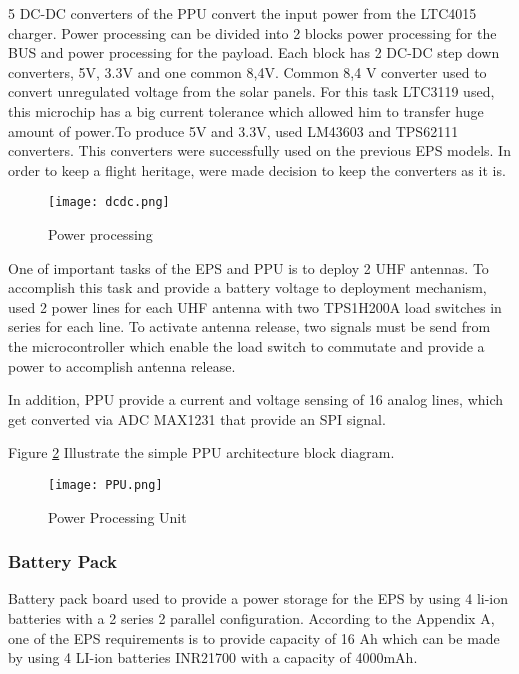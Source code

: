   5 DC-DC converters of the PPU convert the input power from the LTC4015 charger. Power processing can be divided into 2 blocks power processing for the BUS and power processing for the payload. Each block has 2 DC-DC step down converters, 5V, 3.3V and one common 8,4V. Common 8,4 V converter used to convert unregulated voltage from the solar panels. For this task LTC3119 used, this microchip has a big current tolerance which allowed him to transfer huge amount of power.To produce 5V and 3.3V, used LM43603 and TPS62111 converters. This converters were successfully used on the previous EPS models. In order to keep a flight heritage, were made decision to keep the converters as it is. 
  
   \begin{figure}[h]
   	\centering
   	\texttt{[image: dcdc.png]}
   	\caption{Power processing}
   	\label{fig: ltc4015}
   \end{figure}
  
  One of important tasks of the EPS and PPU is to deploy 2 UHF antennas. To accomplish this task and provide a battery voltage to deployment mechanism, used 2 power lines for each UHF antenna with two TPS1H200A load switches in series for each line. To activate antenna release, two signals must be send from the microcontroller which enable the load switch to commutate and provide a power to accomplish antenna release. 
  
  In addition, PPU provide a current and voltage sensing of 16 analog lines,  which get converted via ADC MAX1231 that provide an SPI signal. 
  
  Figure \ref{fig: PPU} Illustrate the simple PPU architecture block diagram. 
  
  \begin{figure}[h]
  	\centering
  	\texttt{[image: PPU.png]}
  	\caption{Power Processing Unit}
  	\label{fig: PPU}
  \end{figure}
  
     \subsubsection{Battery Pack}
  
 Battery pack board used to provide a power storage for the EPS by using 4 li-ion batteries with a 2 series 2 parallel configuration. According to the Appendix A, one of the EPS requirements is to provide capacity of 16 Ah which can be made by using 4 LI-ion batteries INR21700 with a capacity of 4000mAh.
 
